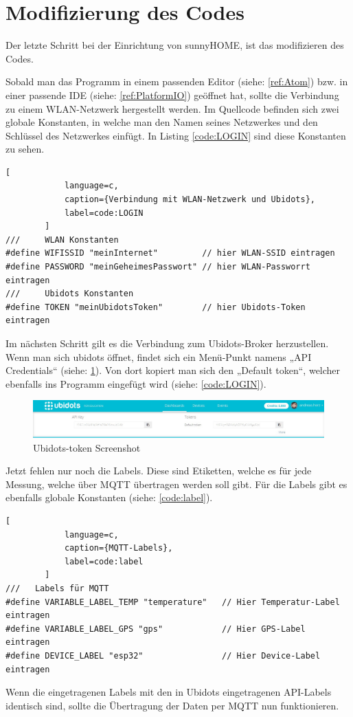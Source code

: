 \section{Modifizierung des Codes}
 
    Der letzte Schritt bei der Einrichtung von sunnyHOME, ist das modifizieren des Codes.
    
    Sobald man das Programm in einem passenden Editor (siehe: \ref{ref:Atom}) bzw. in einer passende IDE (siehe: \ref{ref:PlatformIO}) geöffnet hat, sollte die Verbindung zu einem WLAN-Netzwerk hergestellt werden. Im Quellcode befinden sich zwei globale Konstanten, in welche man den Namen seines Netzwerkes und den Schlüssel des Netzwerkes einfügt. In Listing \ref{code:LOGIN} sind diese Konstanten zu sehen. 
    
    \begin{lstlisting}[
            language=c,
            caption={Verbindung mit WLAN-Netzwerk und Ubidots},
            label=code:LOGIN
        ]
///     WLAN Konstanten
#define WIFISSID "meinInternet"         // hier WLAN-SSID eintragen
#define PASSWORD "meinGeheimesPasswort" // hier WLAN-Passworrt eintragen
///     Ubidots Konstanten
#define TOKEN "meinUbidotsToken"        // hier Ubidots-Token eintragen
    \end{lstlisting}
    
    Im nächsten Schritt gilt es die Verbindung zum Ubidots-Broker herzustellen. Wenn man sich ubidots öffnet, findet sich ein Menü-Punkt namens „API Credentials“ (siehe: \ref{fig:ubitoken}). Von dort kopiert man sich den „Default token“, welcher ebenfalls ins Programm eingefügt wird (siehe: \ref{code:LOGIN}).
      
    \begin{figure}[H]
            \centering
            \includegraphics[width=1\textwidth]{./media/images/ubitoken.jpg}
            \caption{Ubidots-token Screenshot\cite{bib:ubidots}}
            \label{fig:ubitoken}
    \end{figure}  
    
    Jetzt fehlen nur noch die Labels. Diese sind Etiketten, welche es für jede Messung, welche über MQTT übertragen werden soll gibt. Für die Labels gibt es ebenfalls globale Konstanten (siehe: \ref{code:label}). 
    
\begin{lstlisting}[
            language=c,
            caption={MQTT-Labels},
            label=code:label
        ]
///   Labels für MQTT
#define VARIABLE_LABEL_TEMP "temperature"   // Hier Temperatur-Label eintragen
#define VARIABLE_LABEL_GPS "gps"            // Hier GPS-Label eintragen
#define DEVICE_LABEL "esp32"                // Hier Device-Label eintragen
    \end{lstlisting}
    
    Wenn die eingetragenen Labels mit den in Ubidots eingetragenen API-Labels identisch sind, sollte die Übertragung der Daten per MQTT nun funktionieren. 

    
    
    
\pagebreak

